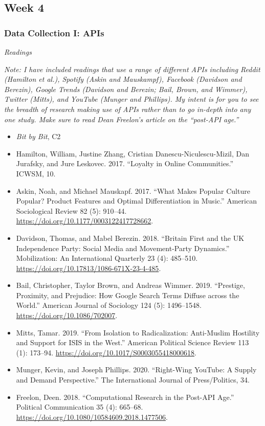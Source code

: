 \documentclass[
  10pt,
]{article}
\providecommand{\tightlist}{%
  \setlength{\itemsep}{0pt}\setlength{\parskip}{0pt}}
\begin{document}
\hypertarget{week-4}{%
\subsection{Week 4}\label{week-4}}

\hypertarget{data-collection-i-apis}{%
\subsubsection{Data Collection I: APIs}\label{data-collection-i-apis}}

\emph{Readings}

\emph{Note: I have included readings that use a range of different APIs
including Reddit (Hamilton et al.), Spotify (Askin and Mauskampf),
Facebook (Davidson and Berezin), Google Trends (Davidson and Berezin;
Bail, Brown, and Wimmer), Twitter (Mitts), and YouTube (Munger and
Phillips). My intent is for you to see the breadth of research making
use of APIs rather than to go in-depth into any one study. Make sure to
read Dean Freelon's article on the ``post-API age.''}

\begin{itemize}
\tightlist
\item
  \emph{Bit by Bit}, C2
\item
  Hamilton, William, Justine Zhang, Cristian Danescu-Niculescu-Mizil,
  Dan Jurafsky, and Jure Leskovec. 2017. ``Loyalty in Online
  Communities.'' ICWSM, 10.
\item
  Askin, Noah, and Michael Mauskapf. 2017. ``What Makes Popular Culture
  Popular? Product Features and Optimal Differentiation in Music.''
  American Sociological Review 82 (5): 910--44.
  \url{https://doi.org/10.1177/0003122417728662}.
\item
  Davidson, Thomas, and Mabel Berezin. 2018. ``Britain First and the UK
  Independence Party: Social Media and Movement-Party Dynamics.''
  Mobilization: An International Quarterly 23 (4): 485--510.
  \url{https://doi.org/10.17813/1086-671X-23-4-485}.
\item
  Bail, Christopher, Taylor Brown, and Andreas Wimmer. 2019. ``Prestige,
  Proximity, and Prejudice: How Google Search Terms Diffuse across the
  World.'' American Journal of Sociology 124 (5): 1496--1548.
  \url{https://doi.org/10.1086/702007}.
\item
  Mitts, Tamar. 2019. ``From Isolation to Radicalization: Anti-Muslim
  Hostility and Support for ISIS in the West.'' American Political
  Science Review 113 (1): 173--94.
  \url{https://doi.org/10.1017/S0003055418000618}.
\item
  Munger, Kevin, and Joseph Phillips. 2020. ``Right-Wing YouTube: A
  Supply and Demand Perspective.'' The International Journal of
  Press/Politics, 34.
\item
  Freelon, Deen. 2018. ``Computational Research in the Post-API Age.''
  Political Communication 35 (4): 665--68.
  \url{https://doi.org/10.1080/10584609.2018.1477506}.
\end{itemize}
\end{document}
